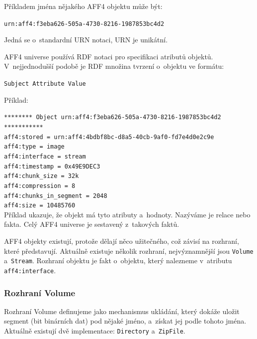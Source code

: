 \vspace{0.5cm}

\noindent Příkladem jména nějakého AFF4 objektu může být:

\texttt{urn:aff4:f3eba626-505a-4730-8216-1987853bc4d2}

\noindent Jedná se o~standardní URN notaci, URN je unikátní.

\vspace{0.5cm}

\noindent AFF4 universe používá RDF notaci pro specifikaci atributů objektů. V~nejjednodušší podobě je RDF množina tvrzení o~objektu ve formátu:

\texttt{Subject   Attribute   Value}

\vspace{0.5cm}

\noindent Příklad:

\noindent \texttt{******** Object urn:aff4:f3eba626-505a-4730-8216-1987853bc4d2 ***********}\\
\texttt{aff4:stored = urn:aff4:4bdbf8bc-d8a5-40cb-9af0-fd7e4d0e2c9e}\\
\texttt{aff4:type = image}\\
\texttt{aff4:interface = stream}\\
\texttt{aff4:timestamp = 0x49E9DEC3}\\
\texttt{aff4:chunk\_size = 32k}\\
\texttt{aff4:compression = 8}\\
\texttt{aff4:chunks\_in\_segment = 2048}\\
\texttt{aff4:size = 10485760}\\

\noindent Příklad ukazuje, že objekt má tyto atributy a~hodnoty. Nazýváme je relace nebo fakta. Celý AFF4 universe je sestavený z~takových faktů.

\noindent AFF4 objekty existují, protože dělají něco užitečného, což závisí na rozhraní, které představují. Aktuálně existuje několik rozhraní, nejvýznamnější jsou \texttt{Volume} a~\texttt{Stream}. Rozhraní objektu je fakt o~objektu, který nalezneme v~atributu \texttt{aff4:interface}.

\subsubsection{Rozhraní Volume}
Rozhraní Volume definujeme jako mechanismus ukládání, který dokáže uložit segment (bit binárních dat) pod nějaké jméno, a~získat jej podle tohoto jména. Aktuálně existují dvě implementace: \texttt{Directory} a~\texttt{ZipFile}.

